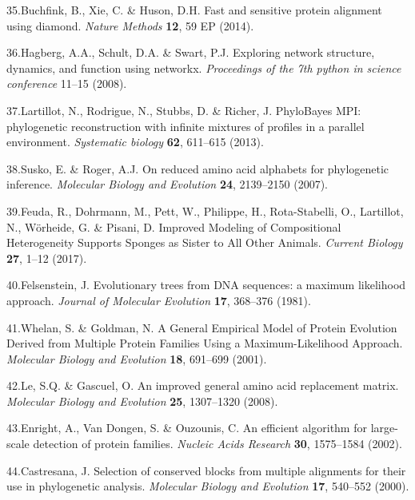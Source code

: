 \documentclass[]{article}
\begin{document}
\leavevmode\hypertarget{ref-Buchfink:2014}{}%
35.Buchfink, B., Xie, C. \& Huson, D.H. Fast and sensitive protein
alignment using diamond. \emph{Nature Methods} \textbf{12}, 59 EP
(2014).

\leavevmode\hypertarget{ref-Hagberg:2008}{}%
36.Hagberg, A.A., Schult, D.A. \& Swart, P.J. Exploring network
structure, dynamics, and function using networkx. \emph{Proceedings of
the 7th python in science conference} 11--15 (2008).

\leavevmode\hypertarget{ref-Lartillot:2013fg}{}%
37.Lartillot, N., Rodrigue, N., Stubbs, D. \& Richer, J. PhyloBayes MPI:
phylogenetic reconstruction with infinite mixtures of profiles in a
parallel environment. \emph{Systematic biology} \textbf{62}, 611--615
(2013).

\leavevmode\hypertarget{ref-Susko:2007ds}{}%
38.Susko, E. \& Roger, A.J. On reduced amino acid alphabets for
phylogenetic inference. \emph{Molecular Biology and Evolution}
\textbf{24}, 2139--2150 (2007).

\leavevmode\hypertarget{ref-Feuda:2017ew}{}%
39.Feuda, R., Dohrmann, M., Pett, W., Philippe, H., Rota-Stabelli, O.,
Lartillot, N., Wörheide, G. \& Pisani, D. Improved Modeling of
Compositional Heterogeneity Supports Sponges as Sister to All Other
Animals. \emph{Current Biology} \textbf{27}, 1--12 (2017).

\leavevmode\hypertarget{ref-Felsenstein:1981vk}{}%
40.Felsenstein, J. Evolutionary trees from DNA sequences: a maximum
likelihood approach. \emph{Journal of Molecular Evolution} \textbf{17},
368--376 (1981).

\leavevmode\hypertarget{ref-Whelan:2001ds}{}%
41.Whelan, S. \& Goldman, N. A General Empirical Model of Protein
Evolution Derived from Multiple Protein Families Using a
Maximum-Likelihood Approach. \emph{Molecular Biology and Evolution}
\textbf{18}, 691--699 (2001).

\leavevmode\hypertarget{ref-Le:2008fp}{}%
42.Le, S.Q. \& Gascuel, O. An improved general amino acid replacement
matrix. \emph{Molecular Biology and Evolution} \textbf{25}, 1307--1320
(2008).

\leavevmode\hypertarget{ref-Enright:2002uq}{}%
43.Enright, A., Van Dongen, S. \& Ouzounis, C. An efficient algorithm
for large-scale detection of protein families. \emph{Nucleic Acids
Research} \textbf{30}, 1575--1584 (2002).

\leavevmode\hypertarget{ref-Castresana:2000vy}{}%
44.Castresana, J. Selection of conserved blocks from multiple alignments
for their use in phylogenetic analysis. \emph{Molecular Biology and
Evolution} \textbf{17}, 540--552 (2000).
\end{document}
